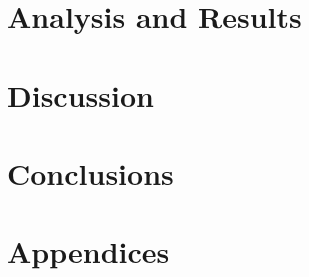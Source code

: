 \documentclass[11pt,a4paper ,oneside ,openany]{book}
\begin{document}
\chapter{Analysis and Results}
\label{chapter4}


\chapter{Discussion}
\label{chapter5}


\chapter{Conclusions}
\label{conclusions}


\chapter{Appendices}
\label{appendices}
 

\backmatter
\clearpage
\newpage

\end{document}
